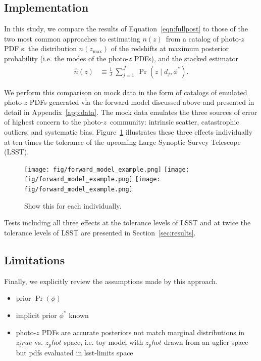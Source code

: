 \documentclass[iop]{emulateapj}
\newcommand{\nz}{$n(z)$}
\newcommand{\pz}{photo-$z$}
\newcommand{\pzpdf}{photo-$z$ PDF}
\begin{document}
\subsection{Implementation}
\label{sec:implementation}

In this study, we compare the results of Equation~\ref{eqn:fullpost} to those 
of the two most common approaches to estimating \nz\ from a catalog of \pzpdf 
s: the distribution $n(z_{\mathrm{max}})$ of the redshifts at maximum posterior 
probability (i.e. the modes of the \pzpdf s), and the stacked estimator
\begin{align}
  \label{eqn:stacked}
  \hat{n}(z) &\equiv \frac{1}{J}\ \sum_{j=1}^{J}\ \Pr(z \mid d_{j}, \phi^{*}) .
\end{align}

We perform this comparison on mock data in the form of catalogs of emulated 
\pzpdf s generated via the forward model discussed above and presented in 
detail in Appendix~\ref{app:data}.
The mock data emulates the three sources of error of highest concern to the 
\pz\ community: intrinsic scatter, catastrophic outliers, and systematic bias.
Figure~\ref{fig:mega_scatter} illustrates these three effects individually at 
ten times the tolerance of the upcoming Large Synoptic Survey Telescope (LSST).
\begin{figure}
	\begin{center}
		
\texttt{[image: fig/forward\_model\_example.png]}
    \texttt{[image: fig/forward\_model\_example.png]}
    \texttt{[image: fig/forward\_model\_example.png]}
		\caption{Show this for each individually.}
		\label{fig:mega_scatter}
	\end{center}
\end{figure}
Tests including all three effects at the tolerance levels of LSST and at twice 
the tolerance levels of LSST are presented in Section~\ref{sec:results}.

\subsection{Limitations}
\label{sec:limitations}

Finally, we explicitly review the assumptions made by this approach.
\begin{itemize}
  \item prior $\Pr(\phi)$
  \item implicit prior $\phi^{*}$ known
	\item \pzpdf s are accurate posteriors %
not match marginal distributions in $z_true$ vs. $z_phot$ space, i.e. toy model 
with $z_phot$ drawn from an uglier space but pdfs evaluated in lsst-limits space
	\end{itemize}
\end{document}
